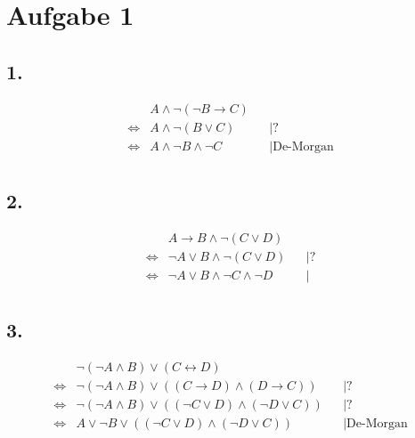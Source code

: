 \documentclass[a4paper,11pt]{article}
\begin{document}
\raggedright %

\section*{Aufgabe 1}
\subsection*{1.}
\begin{align*}
& A \land \neg (\neg B \to C) & \\
\Leftrightarrow & A \land \neg (B \lor C) && \big| \text{?} \\
\Leftrightarrow & A \land \neg B \land \neg C && \big| \text{De-Morgan} \\
\end{align*}

\subsection*{2.}
\begin{align*}
& A \to B \land \neg (C \lor D) & \\
\Leftrightarrow & \neg A \lor B \land \neg (C \lor D) && \big| \text{?} \\
\Leftrightarrow & \neg A \lor B \land \neg C \land \neg D && \big| \text{} \\
\end{align*}

\subsection*{3.}
\begin{align*}
& \neg(\neg A \land B) \lor (C \leftrightarrow D) & \\
\Leftrightarrow & \neg(\neg A \land B) \lor ((C \to D) \land (D \to C)) && \big| \text{?} \\
\Leftrightarrow & \neg(\neg A \land B) \lor ((\neg C \lor D) \land (\neg D \lor C)) && \big| \text{?} \\
\Leftrightarrow & A \lor \neg B \lor ((\neg C \lor D) \land (\neg D \lor C)) && \big| \text{De-Morgan} \\
\end{align*}
\end{document}
